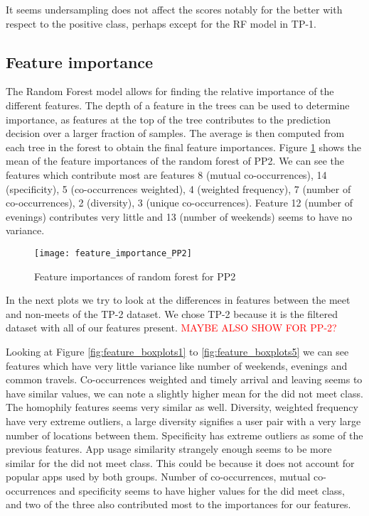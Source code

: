 It seems undersampling does not affect the scores notably for the better with respect to the positive class, perhaps except for the RF model in TP-1.

\subsection{Feature importance}
The Random Forest model allows for finding the relative importance of the different features. The depth of a feature in the trees can be used to determine importance, as features at the top of the tree contributes to the prediction decision over a larger fraction of samples. The average is then computed from each tree in the forest to obtain the final feature importances.
Figure \ref{fig:feature_importances} shows the mean of the feature importances of the random forest of PP2. We can see the features which contribute most are features 8 (mutual co-occurrences), 14 (specificity), 5 (co-occurrences weighted), 4 (weighted frequency), 7 (number of co-occurrences), 2 (diversity), 3 (unique co-occurrences). Feature 12 (number of evenings) contributes very little and 13 (number of weekends) seems to have no variance.
\begin{figure}[H]
    \hspace*{-1.0cm}
    \centering
    \texttt{[image: feature\_importance\_PP2]}
    \caption{Feature importances of random forest for PP2}
    \label{fig:feature_importances}
\end{figure}

In the next plots we try to look at the differences in features between the meet and non-meets of the TP-2 dataset. We chose TP-2 because it is the filtered dataset with all of our features present. \textcolor{red}{MAYBE ALSO SHOW FOR PP-2?}

Looking at Figure \ref{fig:feature_boxplots1} to \ref{fig:feature_boxplots5} we can see features which have very little variance like number of weekends, evenings and common travels. Co-occurrences weighted and timely arrival and leaving seems to have similar values, we can note a slightly higher mean for the did not meet class. The homophily features seems very similar as well. Diversity, weighted frequency have very extreme outliers, a large diversity signifies a user pair with a very large number of locations between them. Specificity has extreme outliers as some of the previous features. App usage similarity strangely enough seems to be more similar for the did not meet class. This could be because it does not account for popular apps used by both groups. Number of co-occurrences, mutual co-occurrences and specificity seems to have higher values for the did meet class, and two of the three also contributed most to the importances for our features.

